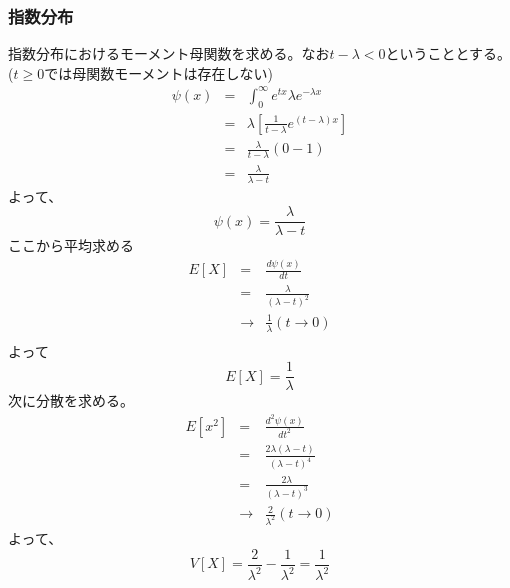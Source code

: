 \documentclass[a4paper,10pt]{jarticle}
\begin{document}
\subsubsection{指数分布}

指数分布におけるモーメント母関数を求める。なお$t-\lambda <0$ということとする。($t\geq 0$では母関数モーメントは存在しない)
\begin{eqnarray*}
    \psi(x) &=&\int_0^\infty e^{tx}\lambda e^{-\lambda x}\\
    &=& \lambda\left[\frac{1}{t-\lambda}e^{(t-\lambda)x}\right]\\
    &=& \frac{\lambda}{t-\lambda}(0-1)\\
    &=& \frac{\lambda}{\lambda - t}
\end{eqnarray*}
よって、
\begin{equation}
    \psi(x)  = \frac{\lambda}{\lambda - t}\tag{3,47}
\end{equation}
ここから平均求める
\begin{eqnarray*}
    E[X] &=& \frac{d\psi(x)}{dt}\\
    &=& \frac{\lambda}{(\lambda-t)^2}\\
    &\rightarrow&\frac{1}{\lambda}(t\rightarrow 0)\\
\end{eqnarray*}
よって
\begin{equation}
    E[X] = \frac{1}{\lambda}\tag{3,48}
\end{equation}
次に分散を求める。
\begin{eqnarray*}
    E[x^2] &=& \frac{d^2\psi(x)}{dt^2}\\
    &=& \frac{2\lambda(\lambda-t)}{(\lambda-t)^4}\\
    &=& \frac{2\lambda}{(\lambda-t)^3}\\
    &\rightarrow&\frac{2}{\lambda^2}(t\rightarrow 0)
\end{eqnarray*}
よって、
\begin{equation}
    V[X] = \frac{2}{\lambda^2}-\frac{1}{\lambda^2} =\frac{1}{\lambda^2}\tag{3,49}
\end{equation}
\end{document}
